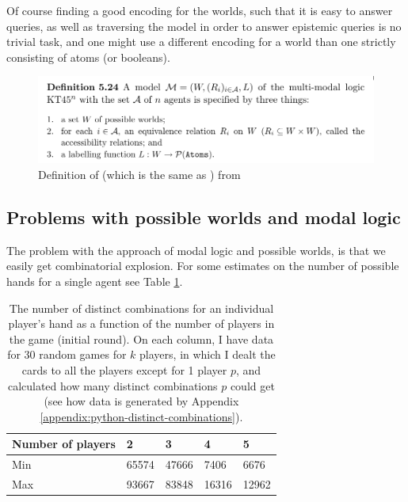 Of course finding a good encoding for the worlds, such that it is easy to answer queries, as well as traversing the model in order to answer epistemic queries is no trivial task, and one might use a different encoding for a world than one strictly consisting of atoms (or booleans).


\begin{figure}
	\centering
\includegraphics[width=13cm,frame]{images/kt45n-definition.png}
	\caption{Definition of \KTfourfiveN (which is the same as \SfiveN{}) from \cite{HuthAndRyan2004KT45n}}
	\label{fig:kt45n-definition}
\end{figure}


\subsection{Problems with possible worlds and modal logic}
The problem with the approach of modal logic and possible worlds, is that we easily get combinatorial explosion. 
For some estimates on the number of possible hands for a single agent see Table \ref{table:combinations}.

\begin{table}
	\centering
\begin{tabular}{l|llll}
Number of players & 2       & 3       & 4       & 5      \\\hline
Min               & 65574   & 47666   & 7406    & 6676   \\
Max               & 93667   & 83848   & 16316   & 12962 
\end{tabular}
	\caption{The number of distinct combinations for an individual player's hand as a function of the number of players in the game (initial round). 
	On each column, I have data for 30 random games for $k$ players, 
	in which I dealt the cards to all the players except for 1 player $p$, and calculated how many distinct combinations $p$ could get (see how data is generated by Appendix \ref{appendix:python-distinct-combinations}).}
	\label{table:combinations}
\end{table}


